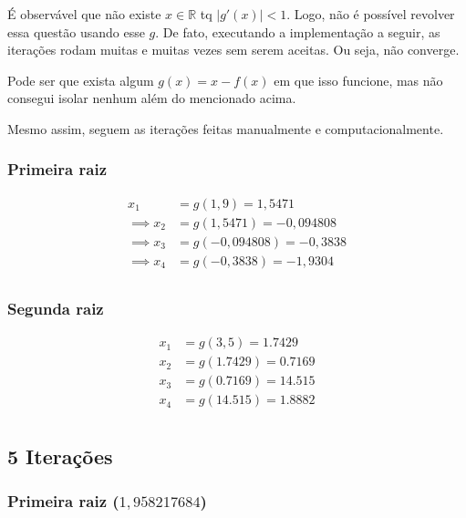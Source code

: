 \documentclass[12pt]{article}
\begin{document}
É observável que não existe \(x \in \mathbb{R}\) tq \(|g'(x)| < 1\). Logo, não é possível revolver essa questão usando esse \(g\). De fato, executando a implementação a seguir, as iterações rodam muitas e muitas vezes sem serem aceitas. Ou seja, não converge.

Pode ser que exista algum \(g(x) = x - f(x)\) em que isso funcione, mas não consegui isolar nenhum além do mencionado acima.

Mesmo assim, seguem as iterações feitas manualmente e computacionalmente.

\subsubsection{Primeira raiz}
\begin{align*}
    x_1 &= g(1,9) = 1,5471 \\
    \implies x_2 &= g(1,5471) = -0,094808 \\
    \implies x_3 &= g(-0,094808) = -0,3838 \\
    \implies x_4 &= g(-0,3838) = -1,9304 \\
\end{align*}

\subsubsection{Segunda raiz}
\begin{align*}
    x_1 &= g(3,5) = 1.7429 \\
    x_2 &= g(1.7429) = 0.7169 \\
    x_3 &= g(0.7169) = 14.515 \\
    x_4 &= g(14.515) = 1.8882 \\
\end{align*}

\subsection{5 Iterações}

\subsubsection{Primeira raiz (\(1,958217684\))}
\end{document}
